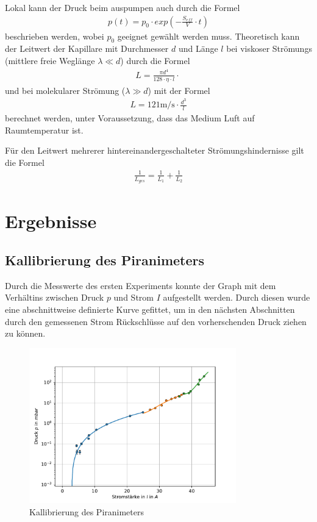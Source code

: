 \documentclass[11pt, a4paper]{article}
\begin{document}
    Lokal kann der Druck beim auspumpen auch durch die Formel
    \begin{align}
        p\left(t\right) = p_0 \cdot exp\left(- \frac{S_{eff}}{V} \cdot t\right)
    \end{align}
    beschrieben werden, wobei $p_0$ geeignet gewählt werden muss.
    Theoretisch kann der Leitwert der Kapillare mit Durchmesser $d$ und Länge $l$ bei viskoser Strömungs (mittlere freie Weglänge $\lambda \ll d$) durch die Formel
    \begin{align}
        L = \frac{\pi d^4}{128 \cdot \eta \cdot l} \cdot \frac{}{} \label{leitvisk}
    \end{align}
    und bei molekularer Strömung ($\lambda \gg d$) mit der Formel
    \begin{align}
        L = 121 \si{\meter\per\second} \cdot \frac{d^3}{l}
    \end{align}
    berechnet werden, unter Voraussetzung, dass das Medium Luft auf Raumtemperatur ist.

    Für den Leitwert mehrerer hintereinandergeschalteter Strömungshindernisse gilt die Formel
    \begin{align}
        \frac{1}{L_{ges}} = \frac{1}{L_1} + \frac{1}{L_2}
    \end{align}






    \section{Ergebnisse}
    \subsection{Kallibrierung des Piranimeters}
    Durch die Messwerte des ersten Experiments konnte der Graph mit dem Verhältins zwischen Druck $p$ und Strom $I$ aufgestellt werden. Durch diesen wurde eine abschnittweise definierte Kurve gefittet, um in den nächsten Abschnitten durch den gemessenen Strom Rückschlüsse auf den vorherschenden Druck ziehen zu können.
    \begin{figure}[h]
        \centering
        \includegraphics[width=0.8\textwidth]{Kallibrierung.pdf}
        \caption{Kallibrierung des Piranimeters}
        \label{fig:piranim}
    \end{figure}
\end{document}
